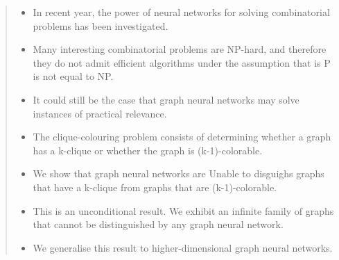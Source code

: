 \begin{abstract}
\begin{itemize}
    \item In recent year, the power of neural networks for solving combinatorial problems has been investigated. 
    \item Many interesting combinatorial problems are NP-hard, and therefore they do not admit efficient algorithms under the assumption that is P is not equal to NP. 
    \item It could still be the case that graph neural networks may solve instances of practical relevance. 
    \item The clique-colouring problem consists of determining whether a graph has a k-clique or whether the graph is (k-1)-colorable. 
    \item We show that graph neural networks are Unable to disguighs graphs that have a k-clique from graphs that are (k-1)-colorable. 
    \item This is an unconditional result. We exhibit an infinite family of graphs that cannot be distinguished by any graph neural network. 
    \item We generalise this result to higher-dimensional graph neural networks. 

\end{itemize}
\end{abstract}